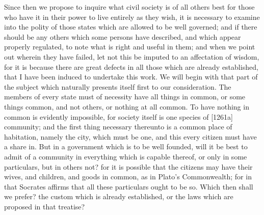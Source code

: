 

Since then we propose to inquire what civil society is of all others best
for those who have it in their power to live entirely as they wish, it is
necessary to examine into the polity of those states which are allowed to
be well governed; and if there should be any others which some persons
have described, and which appear properly regulated, to note what is right
and useful in them; and when we point out wherein they have failed, let
not this be imputed to an affectation of wisdom, for it is because there
are great defects in all those which are already established, that I have
been induced to undertake this work. We will begin with that part of the
subject which naturally presents itself first to our consideration. The
members of every state must of necessity have all things in common, or
some things common, and not others, or nothing at all common. To have
nothing in common is evidently impossible, for society itself is one
species of [1261a] community; and the first thing necessary thereunto is a
common place of habitation, namely the city, which must be one, and this
every citizen must have a share in. But in a government which is to be
well founded, will it be best to admit of a community in everything which
is capable thereof, or only in some particulars, but in others not? for it
is possible that the citizens may have their wives, and children, and
goods in common, as in Plato's Commonwealth; for in that Socrates affirms
that all these particulars ought to be so. Which then shall we prefer? the
custom which is already established, or the laws which are proposed in
that treatise?


